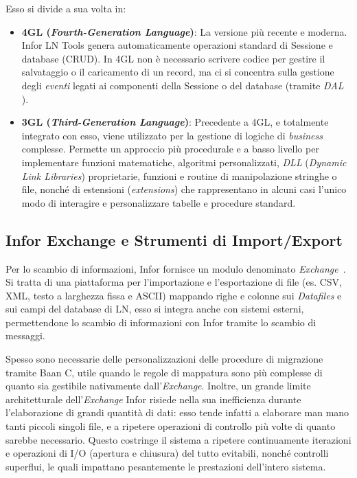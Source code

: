 Esso si divide a sua volta in:
\begin{itemize}
    \item \textbf{4GL (\textit{Fourth-Generation Language})}: La versione più recente e moderna.
    Infor LN Tools genera automaticamente operazioni standard di Sessione e database (CRUD). In 4GL non è necessario
    scrivere codice per gestire il salvataggio o il caricamento di un record, ma ci si concentra sulla gestione
    degli \textit{eventi} legati ai componenti della Sessione o del database (tramite \textit{DAL} \cite{inforDal2Guide}).
    \item \textbf{3GL (\textit{Third-Generation Language})}: Precedente a 4GL, e totalmente integrato con esso, viene utilizzato
    per la gestione di logiche di \textit{business} complesse.
    Permette un approccio più procedurale e a basso livello per implementare funzioni matematiche, algoritmi personalizzati,
    \textit{DLL} (\textit{Dynamic Link Libraries}) proprietarie, funzioni e routine di manipolazione stringhe o file, nonché di estensioni (\textit{extensions})
    che rappresentano in alcuni casi l'unico modo di interagire e personalizzare tabelle e procedure standard.
\end{itemize}

\subsection{Infor Exchange e Strumenti di Import/Export}\label{subsec:infor-exchange-e-strumenti-di-import/export}
Per lo scambio di informazioni, Infor fornisce un modulo denominato \textit{Exchange}~\cite{inforExchangeGuide}.
Si tratta di una piattaforma per l'importazione e l'esportazione di file (es.
CSV, XML, testo a larghezza fissa e ASCII) mappando righe e colonne sui \textit{Datafiles} e sui campi del database di LN,
esso si integra anche con sistemi esterni, permettendone lo scambio di informazioni con Infor tramite lo scambio di messaggi.

Spesso sono necessarie delle personalizzazioni delle procedure di migrazione tramite Baan C, utile quando le regole di
mappatura sono più complesse di quanto sia gestibile nativamente dall'\textit{Exchange}.
Inoltre, un grande limite architetturale dell'\textit{Exchange} Infor risiede nella sua inefficienza durante l'elaborazione
di grandi quantità di dati: esso tende infatti a elaborare man mano tanti piccoli singoli file, e a ripetere operazioni di controllo più volte di quanto sarebbe necessario.
Questo costringe il sistema a ripetere continuamente iterazioni e operazioni di I/O (apertura e chiusura) del tutto evitabili,
nonché controlli superflui, le quali impattano pesantemente le prestazioni dell'intero sistema.

